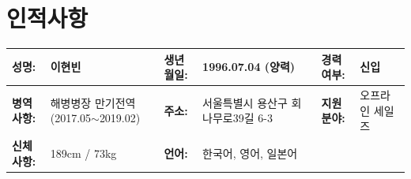 \documentclass[a4paper,10pt]{extarticle}
\begin{document}
\renewcommand*{\arraystretch}{1.5}
\noindent
\section*{인적사항}
\begin{center}
    \vspace*{-0.8cm}
    \noindent
    \begin{longtable}{LRLRLR}
        \textbf{성명:}   & 이현빈                                      & \textbf{생년월일:} & 1996.07.04 (양력)       & \textbf{경력여부:} & 신입         \\
        \hline
        \textbf{병역사항:} & 해병병장 만기전역 \small{(2017.05$\sim$2019.02)} & \textbf{주소:}   & 서울특별시 용산구 회나무로39길 6-3 & \textbf{지원분야:} & {오프라인 세일즈} \\
        \hline
        \textbf{신체사항: }& 189cm / 73kg & \textbf{언어:} & 한국어, 영어, 일본어
    \end{longtable}
\end{center}




\end{document}
